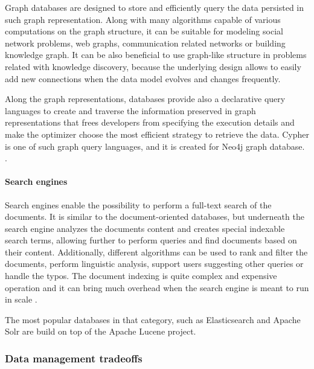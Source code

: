 Graph databases are designed to store and efficiently query the data persisted in such graph representation. Along with many algorithms capable of various computations on the graph structure, it can be suitable for modeling social network problems, web graphs, communication related networks or building knowledge graph. It can be also beneficial to use graph-like structure in problems related with knowledge discovery, because the underlying design allows to easily add new connections when the data model evolves and changes frequently.

Along the graph representations, databases provide also a declarative query languages to create and traverse the information preserved in graph representations that frees developers from specifying the execution details and make the optimizer choose the most efficient strategy to retrieve the data. Cypher is one of such graph query languages, and it is created for Neo4j \cite{Neo4j} graph database. \cite{DesignDataIntensiveApplications}.

\paragraph*{Search engines}

Search engines enable the possibility to perform a full-text search of the documents. It is similar to the document-oriented databases, but underneath the search engine analyzes the documents content and creates special indexable search terms, allowing further to perform queries and find documents based on their content. Additionally, different algorithms can be used to rank and filter the documents, perform linguistic analysis, support users suggesting other queries or handle the typos. The document indexing is quite complex and expensive operation and it can bring much overhead when the search engine is meant to run in scale \cite{DesignDataIntensiveApplications}. 

The most popular databases in that category, such as Elasticsearch \cite{Elasticsearch} and Apache Solr \cite{ApacheSolr} are build on top of the Apache Lucene project.

\subsubsection{Data management tradeoffs}



